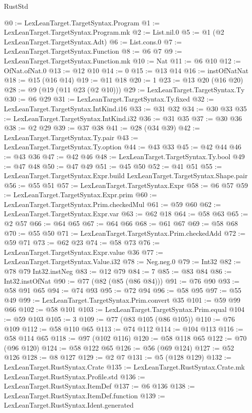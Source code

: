 \begin{lexlean}{RustStd}
\begin{coremodule}
@0 := LexLeanTarget.TargetSyntax.Program
@1 := LexLeanTarget.TargetSyntax.Program.mk
@2 := List.nil.{0}
@5 := @1 (@2 LexLeanTarget.TargetSyntax.Adt)
@6 := List.cons.{0}
@7 := LexLeanTarget.TargetSyntax.Function
@8 := @6 @7
@9 := LexLeanTarget.TargetSyntax.Function.mk
@10 := Nat
@11 := @6 @10
@12 := OfNat.ofNat.{0}
@13 := @12 @10
@14 := 0
@15 := @13 @14
@16 := instOfNatNat
@18 := @15 (@16 @14)
@19 := @11 @18
@20 := 1
@23 := @13 @20 (@16 @20)
@28 := @9 (@19 (@11 @23 (@2 @10)))
@29 := LexLeanTarget.TargetSyntax.Ty
@30 := @6 @29
@31 := LexLeanTarget.TargetSyntax.Ty.fixed
@32 := LexLeanTarget.TargetSyntax.IntKind.i16
@33 := @31 @32
@34 := @30 @33
@35 := LexLeanTarget.TargetSyntax.IntKind.i32
@36 := @31 @35
@37 := @30 @36
@38 := @2 @29
@39 := @37 @38
@41 := @28 (@34 @39)
@42 := LexLeanTarget.TargetSyntax.Ty.pair
@43 := LexLeanTarget.TargetSyntax.Ty.option
@44 := @43 @33
@45 := @42 @44
@46 := @43 @36
@47 := @42 @46
@48 := LexLeanTarget.TargetSyntax.Ty.bool
@49 := @47 @48
@50 := @47 @49
@51 := @45 @50
@52 := @41 @51
@55 := LexLeanTarget.TargetSyntax.Expr.build LexLeanTarget.TargetSyntax.Shape.pair
@56 := @55 @51
@57 := LexLeanTarget.TargetSyntax.Expr
@58 := @6 @57
@59 := LexLeanTarget.TargetSyntax.Expr.prim
@60 := LexLeanTarget.TargetSyntax.Prim.checkedMul
@61 := @59 @60
@62 := LexLeanTarget.TargetSyntax.Expr.var
@63 := @62 @18
@64 := @58 @63
@65 := @2 @57
@66 := @64 @65
@67 := @64 @66
@68 := @61 @67
@69 := @58 @68
@70 := @55 @50
@71 := LexLeanTarget.TargetSyntax.Prim.checkedAdd
@72 := @59 @71
@73 := @62 @23
@74 := @58 @73
@76 := LexLeanTarget.TargetSyntax.Expr.value @36
@77 := LexLeanTarget.TargetSyntax.Value.i32
@78 := Neg.neg.{0}
@79 := Int32
@82 := @78 @79 Int32.instNeg
@83 := @12 @79
@84 := 7
@85 := @83 @84
@86 := Int32.instOfNat
@90 := @77 (@82 (@85 (@86 @84)))
@91 := @76 @90
@93 := @58 @91 @65
@94 := @74 @93
@95 := @72 @94
@96 := @58 @95
@97 := @55 @49
@99 := LexLeanTarget.TargetSyntax.Prim.convert @35
@101 := @59 @99 @66
@102 := @58 @101
@103 := LexLeanTarget.TargetSyntax.Prim.equal
@104 := @59 @103
@105 := 3
@109 := @77 (@83 @105 (@86 @105))
@110 := @76 @109
@112 := @58 @110 @65
@113 := @74 @112
@114 := @104 @113
@116 := @58 @114 @65
@118 := @97 (@102 @116)
@120 := @58 @118 @65
@122 := @70 (@96 @120)
@124 := @58 @122 @65
@126 := @56 (@69 @124)
@127 := @52 @126
@128 := @8 @127
@129 := @2 @7
@131 := @5 (@128 @129)
@132 := LexLeanTarget.RustSyntax.Crate
@135 := LexLeanTarget.RustSyntax.Crate.mk LexLeanTarget.RustSyntax.Profile.std
@136 := LexLeanTarget.RustSyntax.ItemDef
@137 := @6 @136
@138 := LexLeanTarget.RustSyntax.ItemDef.function
@139 := LexLeanTarget.RustSyntax.Ident.generated

\end{coremodule}
\end{lexlean}
